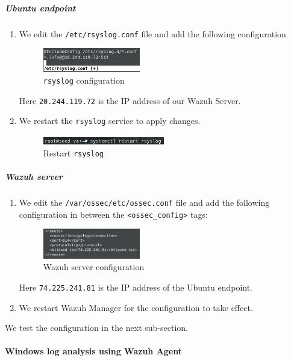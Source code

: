 \subparagraph{Ubuntu endpoint}
\begin{enumerate}
    \item We edit the \texttt{/etc/rsyslog.conf} file and add the following configuration
    \begin{figure} [H]
    \centering
    \includegraphics[width=0.4\textwidth]{images/log-data/1.png}
    \caption{\texttt{rsyslog} configuration}
    \end{figure}
    Here \texttt{20.244.119.72} is the IP address of our Wazuh Server.
    \item We restart the \texttt{rsyslog} service to apply changes.
    \begin{figure} [H]
    \centering
    \includegraphics[width=0.5\textwidth]{images/log-data/2.png}
    \caption{Restart \texttt{rsyslog}}
    \end{figure}
\end{enumerate}

\subparagraph{Wazuh server}
\begin{enumerate}
    \item We edit the \texttt{/var/ossec/etc/ossec.conf} file and add the following configuration in between the \texttt{<ossec\_config>} tags:
    \begin{figure} [H]
    \centering
    \includegraphics[width=0.4\textwidth]{images/log-data/3.png}
    \caption{Wazuh server configuration}
    \end{figure}
    Here \texttt{74.225.241.81} is the IP address of the Ubuntu endpoint.
    
    \item We restart Wazuh Manager for the configuration to take effect.
\end{enumerate}

We test the configuration in the next sub-section. 

\paragraph{Windows log analysis using Wazuh Agent}


